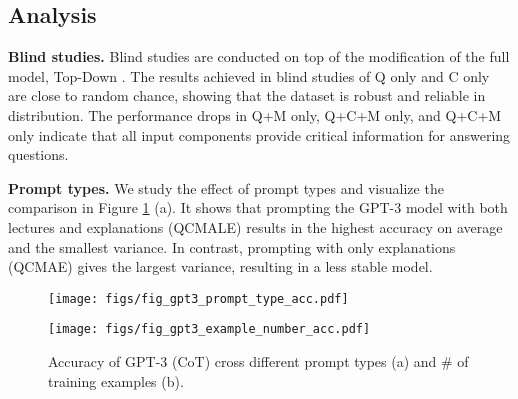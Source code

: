 \begin{table}[ht]
\centering
\fontsize{8.5pt}{\baselineskip}\selectfont \renewcommand\tabcolsep{2.0pt} \renewcommand\arraystretch{1.0} 
\vspace{1mm}
\caption{Automatic metrics (, , Similarity) and human evaluation of generated explanations. Note that a gold explanation refers to one that is relevant, correct, and complete.}
\label{tab:explanation_evaluation}
\end{table}

\subsection{Analysis}
\label{sec:analysis}
\textbf{Blind studies.} Blind studies are conducted on top of the modification of the full model, Top-Down \cite{Anderson2017up}. The results achieved in blind studies of Q only and C only are close to random chance, showing that the \name{} dataset is robust and reliable in distribution. The performance drops in Q+M only, Q+C+M only, and Q+C+M only indicate that all input components provide critical information for answering \name{} questions.

\textbf{Prompt types.} We study the effect of prompt types and visualize the comparison in Figure \ref{fig:gpt3_prompt} (a). It shows that prompting the GPT-3 model with both lectures and explanations (QCMALE) results in the highest accuracy on average and the smallest variance. In contrast, prompting with only explanations (QCMAE) gives the largest variance, resulting in a less stable model.

\begin{figure}[ht] 
\begin{minipage}{0.49\textwidth} 
\centering
 \texttt{[image: figs/fig\_gpt3\_prompt\_type\_acc.pdf]}
\end{minipage}
 \hfill
 \begin{minipage}{0.49\textwidth} 
 \texttt{[image: figs/fig\_gpt3\_example\_number\_acc.pdf]}
 \end{minipage}
\caption{Accuracy of GPT-3 (CoT) cross different prompt types (a) and \# of training examples (b).}
\label{fig:gpt3_prompt}
\end{figure}


